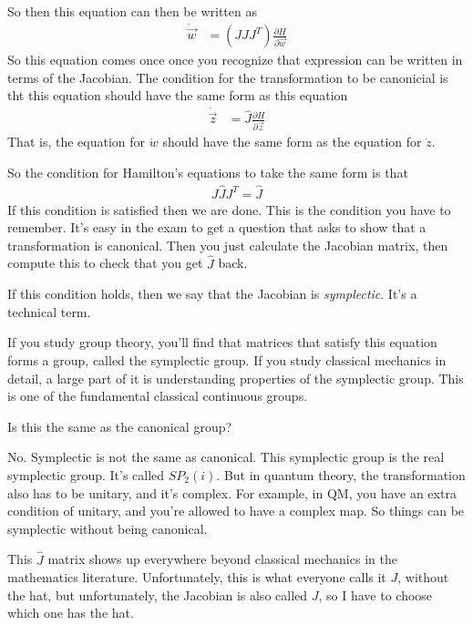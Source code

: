 So then this equation can then be written as
\begin{align}
    \dot{\vec{w}}
    &=
    \left(
    J \hat{J} J^T
    \right)
    \frac{\partial H}{\partial \vec{w}}
\end{align}
So this equation comes once
once you recognize that expression can be written in terms of the Jacobian.
The condition for the transformation to be canonicial is tht this equation
should have the same form as this equation
\begin{align}
    \dot{\vec{z}} &=
    \hat{J}
    \frac{\partial H}{\partial \vec{z}}
\end{align}
That is, 
the equation for $\dot{w}$ should have the same form as the equation for
$\dot{z}$.

So the condition for Hamilton's equations to take the same form is that
\begin{align}
    \boxed{J \hat{J} J^T = \hat{J}}
\end{align}
If this condition is satisfied then we are done.
This is the condition you have to remember.
It's easy in the exam to get a question that asks to show that a transformation
is canonical.
Then you just calculate the Jacobian matrix,
then compute this to check that you get $\hat{J}$ back.

If this condition holds,
then we say that the Jacobian is \emph{symplectic}.
It's a technical term.

If you study group theory,
you'll find that matrices that satisfy this equation forms a group,
called the symplectic group.
If you study classical mechanics in detail,
a large part of it is understanding properties of the symplectic group.
This is one of the fundamental classical continuous groups.

\begin{question}
    Is this the same as the canonical group?
\end{question}
No. Symplectic is not the same as canonical.
This symplectic group is the real symplectic group.
It's called $SP_2(i)$.
But in quantum theory,
the transformation also has to be unitary,
and it's complex.
For example, in QM,
you have an extra condition of unitary,
and you're allowed to have a complex map.
So things can be symplectic without being canonical.

This $\hat{J}$ matrix shows up everywhere beyond classical mechanics
in the mathematics literature.
Unfortunately,
this is what everyone calls it $J$,
without the hat,
but unfortunately,
the Jacobian is also called $J$,
so I have to choose which one has the hat.

